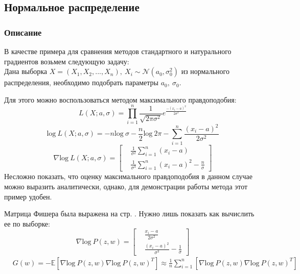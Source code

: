 \documentclass[a4paper,12pt]{article}
\begin{document}
\subsection{Нормальное распределение}
\subsubsection{Описание}
        В качестве примера для сравнения методов стандартного и натурального градиентов возьмем следующую задачу: \\ 
        Дана выборка $X = (X_1, X_2, ..., X_n), ~ X_i \sim \mathcal{N}(a_0, \sigma^2_0)$ из нормального распределения, необходимо подобрать параметры $a_0, ~ \sigma_0$.

        Для этого можно воспользоваться методом максимального правдоподобия:
        $$L(X; a, \sigma) = \prod_{i=1}^n \frac{1}{\sqrt{2\pi\sigma^2}}e^{\frac{-(x_i-a)^2}{2\sigma^2}}$$
        $$\mbox{log} ~ L(X; a, \sigma) = -n \mbox{log} ~ \sigma - \frac{n}{2} \mbox{log} ~ 2\pi - \sum_{i=1}^n \frac{(x_i-a)^2}{2\sigma^2}$$
        $$
            \nabla \mbox{log} ~ L(X; a, \sigma) = 
            \left[
                \begin{aligned}
                    & \frac{1}{\sigma^2}\sum_{i=1}^n (x_i - a) \\
                    & \frac{1}{\sigma^3}\sum_{i=1}^n (x_i - a)^2 - \frac{n}{\sigma}
                \end{aligned}
            \right]
        $$
        Несложно показать, что оценку максимального правдоподобия в данном случае можно выразить аналитически, однако, для демонстрации работы метода этот пример удобен.

        Матрица Фишера была выражена на стр. \pageref{FisherMatrix}.
        Нужно лишь показать как вычислить ее по выборке:
        $$
            \nabla \mbox{log} ~ P(z, w) = 
            \left[
                \begin{aligned}
                    & \frac{x_i - a}{2\sigma^2} \\
                    & \frac{(x_i - a)^2}{\sigma^3} - \frac{1}{\sigma}
                \end{aligned}
            \right]
        $$
        $$
            \begin{aligned}
                & G(w) = \mathbb{-E} \left[ \nabla \mbox{log} ~ P(z, w) \nabla \mbox{log} ~ P(z, w)^T \right] 
                \approx \frac{1}{n}\sum_{i=1}^n \left[ \nabla \mbox{log} ~ P(z, w) \nabla \mbox{log} ~ P(z, w)^T \right] \\
            \end{aligned}
        $$
\end{document}
